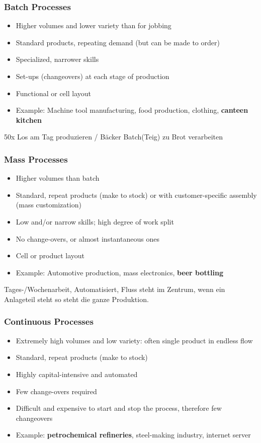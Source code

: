 \subsubsection{Batch Processes}
\begin{itemize}
\item Higher volumes and lower variety than
for jobbing
\item Standard products, repeating demand
(but can be made to order)
\item Specialized, narrower skills
\item Set-ups (changeovers) at each stage of
production
\item Functional or cell layout
\item Example: Machine tool manufacturing,
food production, clothing,\textbf{ canteen
kitchen}
\end{itemize}
50x Los am Tag produzieren / B\"acker Batch(Teig) zu Brot verarbeiten
\subsubsection{Mass Processes}
\begin{itemize}
\item Higher volumes than batch
\item Standard, repeat products (make to
stock) or with customer-specific
assembly (mass customization)
\item Low and/or narrow skills; high degree
of work split
\item No change-overs, or almost
instantaneous ones
\item Cell or product layout
\item Example: Automotive production,
mass electronics,\textbf{ beer bottling}
\end{itemize}
Tages-/Wochenarbeit, Automatisiert, Fluss steht im Zentrum, wenn ein Anlageteil steht so steht die ganze Produktion.
\subsubsection{Continuous Processes}
\begin{itemize}
\item Extremely high volumes and low
variety:
often single product in endless flow
\item Standard, repeat products (make to
stock)
\item Highly capital-intensive and automated
\item Few change-overs required
\item Difficult and expensive to start and stop
the process, therefore few changeovers
\item Example: \textbf{petrochemical refineries},
steel-making industry, internet server
\end{itemize}

